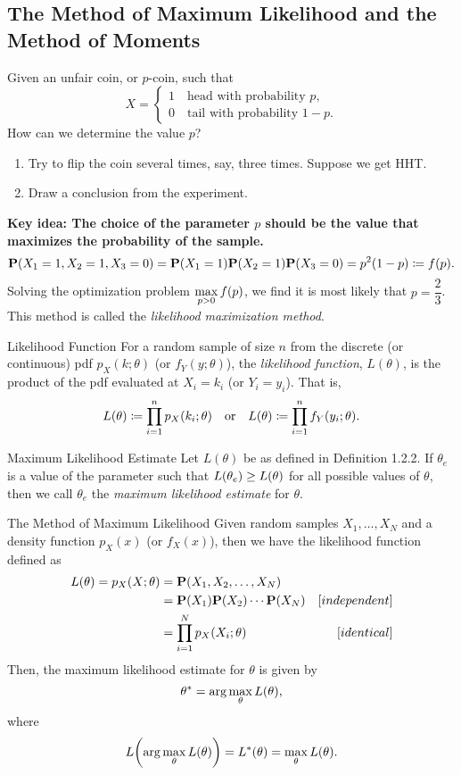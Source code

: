 \subsection{The Method of Maximum Likelihood and the Method of Moments}
\begin{eg}
	Given an unfair coin, or $p$-coin, such that \[X=\begin{cases}1\quad\text{head with probability }p,\\0\quad\text{tail with probability }1-p.\end{cases}\]	How can we determine the value $p$?
	\begin{sol}
		\begin{enumerate}
			\item Try to flip the coin several times, say, three times. Suppose we get HHT. 
			\item Draw a conclusion from the experiment. 
		\end{enumerate}	
		\textbf{Key idea: The choice of the parameter $p$ should be the value that maximizes the probability of the sample.}
		\[\P\qty(X_1=1,X_2=1,X_3=0)=\P\qty(X_1=1)\P(X_2=1)\P(X_3=0)=p^2(1-p)\coloneqq f(p).\] Solving the optimization problem $\dsst\max_{p>0}f(p)$, we find it is most likely that $p=\dfrac{2}{3}$. This method is called the \textit{likelihood maximization method}.
	\end{sol}
\end{eg}
\begin{df}{Likelihood Function}
	For a random sample of size $n$ from the discrete (or continuous) pdf $p_X(k;\theta)$ (or $f_Y(y;\theta)$), the \textit{likelihood function}, $L(\theta)$, is the product of the pdf evaluated at $X_i=k_i$ (or $Y_i=y_i$). That is, \[L(\theta)\coloneqq\prod_{i=1}^np_X\qty(k_i;\theta)\quad\text{or}\quad L(\theta)\coloneqq\prod_{i=1}^nf_Y\qty(y_i;\theta).\]	
\end{df}
\begin{df}{Maximum Likelihood Estimate}
	Let $L(\theta)$ be as defined in Definition 1.2.2. If $\theta_e$ is a value of the parameter such that $L\qty(\theta_e)\geq L(\theta)$ for all possible values of $\theta$, then we call $\theta_e$ the \textit{maximum likelihood estimate} for $\theta$.
\end{df}
\begin{thm}{The Method of Maximum Likelihood}
	Given random samples $X_1,\dots,X_N$ and a density function $p_X(x)$ (or $f_X(x)$), then we have the likelihood function defined as \begin{align*}L(\theta)=p_X(X;\theta)&=\P(X_1,X_2,\dots,X_N)\\&=\P(X_1)\P(X_2)\cdots\P(X_N)&[independent]\\&=\prod_{i=1}^Np_X(X_i;\theta)&[identical]\end{align*} Then, the maximum likelihood estimate for $\theta$ is given by \[\theta^*=\argmax_\theta L(\theta),\] where \[L\qty(\argmax_\theta L(\theta))=L^*(\theta)=\max_\theta L(\theta).\]
\end{thm}
